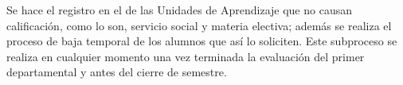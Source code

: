\begin{PDescripcion}
\begin{enumerate}
		\Ppaso[\PSubProceso]  Se hace el registro en el  de las Unidades de Aprendizaje que no causan calificación, como lo son, servicio social y materia electiva; además se realiza el proceso de baja temporal de los alumnos que así lo soliciten. Este subproceso se realiza en cualquier momento una vez terminada la evaluación del primer departamental y antes del cierre de semestre.   
		
		\Ppaso[\PSubProceso] 
		
		
		
	\end{enumerate}
\end{PDescripcion}